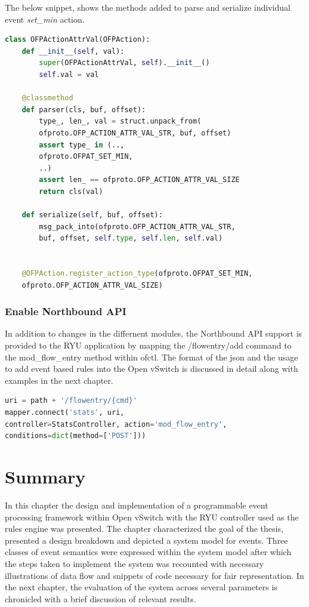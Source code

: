 \begin{itemize}
		The below snippet, shows the methods added to parse and serialize individual event \textit{set_min} action. \newline 
		
	\begin{lstlisting}[language=python]
	class OFPActionAttrVal(OFPAction):
	def __init__(self, val):
		super(OFPActionAttrVal, self).__init__()
		self.val = val

	@classmethod
	def parser(cls, buf, offset):
		type_, len_, val = struct.unpack_from(
		ofproto.OFP_ACTION_ATTR_VAL_STR, buf, offset)
		assert type_ in (..,
		ofproto.OFPAT_SET_MIN,
		..)
		assert len_ == ofproto.OFP_ACTION_ATTR_VAL_SIZE
		return cls(val)
	
	def serialize(self, buf, offset):
		msg_pack_into(ofproto.OFP_ACTION_ATTR_VAL_STR,
		buf, offset, self.type, self.len, self.val) 
	
	
	@OFPAction.register_action_type(ofproto.OFPAT_SET_MIN,
	ofproto.OFP_ACTION_ATTR_VAL_SIZE) 
	\end{lstlisting}	

\end{itemize}

\subsubsection{Enable Northbound API}
In addition to changes in the differnent modules, the Northbound API support is provided to the RYU application by mapping the /flowentry/add command to the mod_flow_entry method within ofctl. The format of the json and the usage to add event based rules into the Open vSwitch is discussed in detail along with examples in the next chapter. \newline


\begin{lstlisting}[language=python]
uri = path + '/flowentry/{cmd}'
mapper.connect('stats', uri,
controller=StatsController, action='mod_flow_entry',
conditions=dict(method=['POST']))
\end{lstlisting}


\section{Summary}
In this chapter the design and implementation of a programmable event processing framework within Open vSwitch with the RYU controller used as the rules engine was presented. The chapter characterized the goal of the thesis, presented a design breakdown and depicted a system model for events. Three classes of event semantics were expressed within the system model after which the steps taken to implement the system was recounted with necessary illustrations of data flow and snippets of code necessary for fair representation. In the next chapter, the evaluation of the system across several parameters is chronicled with a brief discussion of relevant results.


